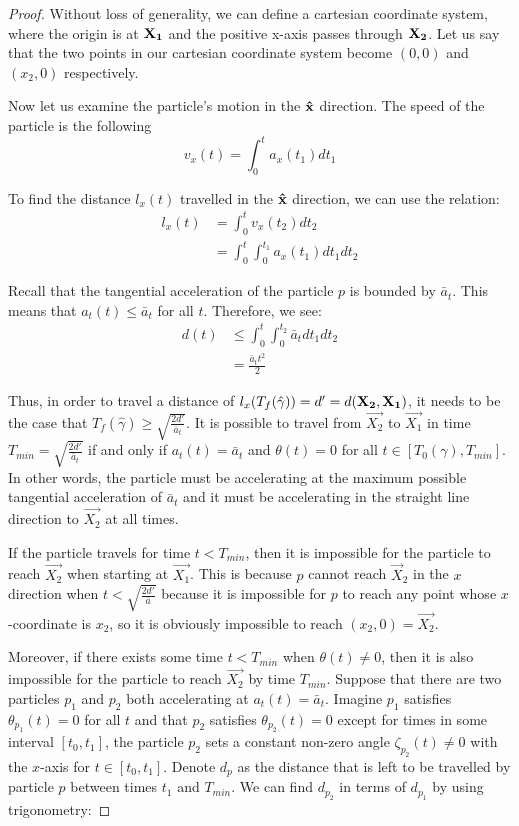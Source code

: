 \begin{proof}

Without loss of generality, we can define a cartesian coordinate system, where the origin is at $\mathbf{X_1}$ and the positive x-axis passes through $\mathbf{X_2}$. Let us say that the two points in our cartesian coordinate system become $(0,0)$ and $(x_2, 0)$ respectively.

Now let us examine the particle's motion in the $\mathbf{\hat{x}}$ direction. The speed of the particle is the following
\begin{equation}
  v_x(t) = \int_0^t a_x(t_1) dt_1
\end{equation}

To find the distance $l_x(t)$ travelled in the $\mathbf{\hat{x}}$ direction, we can use the relation:
\begin{align}
  l_x(t) &= \int_0^t v_x(t_2) dt_2 \\
         &= \int_0^t \int_0^{t_1} a_x(t_1) dt_1 dt_2
\end{align}

Recall that the tangential acceleration of the particle $p$ is bounded by $\bar{a}_{t}$. This means that $a_t(t) \leq \bar{a}_t$ for all $t$. Therefore, we see:
\begin{align}
d(t) &\leq \int_0^t \int_0^{t_2} \bar{a}_t dt_1 dt_2\\
  &= \frac{\bar{a}_t t^2}{2}
\end{align}

Thus, in order to travel a distance of $l_x(T_f(\hat{\gamma})) = d' = d(\mathbf{X_2}, \mathbf{X_1})$, it needs to be the case that $T_f(\hat{\gamma}) \geq \sqrt{\frac{2 d'}{\bar{a}_t}}$. It is possible to travel from $\vec{X_2}$ to $\vec{X_1}$ in time $T_{min} = \sqrt{\frac{2 d'}{\bar{a}_t}}$ if and only if $a_t(t) = \bar{a}_t$ and $\theta(t) = 0$ for all $t \in [T_0(\gamma), T_{min}]$. In other words, the particle must be accelerating at the maximum possible tangential acceleration of $\bar{a}_t$ and it must be accelerating in the straight line direction to $\vec{X_2}$ at all times.

If the particle travels for time $t < T_{min}$, then it is impossible for the particle to reach $\vec{X_2}$ when starting at $\vec{X_1}$. This is because $p$ cannot reach $\vec{X}_2$ in the $x$ direction when $t < \sqrt{\frac{2 d'}{\bar{a}}}$ because it is impossible for $p$ to reach any point whose $x$-coordinate is $x_2$, so it is obviously impossible to reach $(x_2, 0) = \vec{X_2}$.

Moreover, if there exists some time $t < T_{min}$ when $\theta(t) \neq 0$, then it is also impossible for the particle to reach $\vec{X_2}$ by time $T_{min}$. Suppose that there are two particles $p_1$ and $p_2$ both accelerating at $a_t(t) = \bar{a}_t$. Imagine $p_1$ satisfies $\theta_{p_1}(t) = 0$ for all $t$ and that $p_2$ satisfies $\theta_{p_2}(t) = 0$ except for times in some interval $[t_0, t_1]$, the particle $p_2$ sets a constant non-zero angle $\zeta_{p_2}(t) \neq 0$ with the $x$-axis for $t \in [t_0, t_1]$. Denote $d_{p}$ as the distance that is left to be travelled by particle $p$ between times $t_1$ and $T_{min}$. We can find $d_{p_2}$ in terms of $d_{p_1}$ by using trigonometry:


\end{proof}
